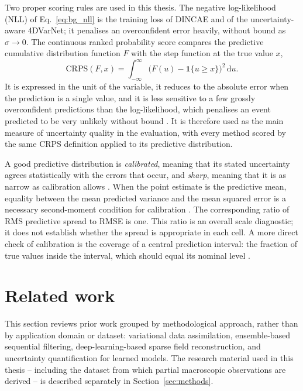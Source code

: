 \documentclass[english, 12pt, a4paper, elec, utf8, a-2b, online]{aaltothesis}
\begin{document}
Two proper scoring rules are used in this thesis. The negative log-likelihood (NLL) of
Eq.~\eqref{eq:bg_nll} is the training loss of DINCAE and of the uncertainty-aware
4DVarNet; it penalises an overconfident error heavily, without bound as
$\sigma \to 0$. The continuous ranked probability score
\cite{gneiting2007scoring} compares the predictive cumulative distribution
function $F$ with the step function at the true value $x$,
\begin{equation}
	\mathrm{CRPS}(F, x) = \int_{-\infty}^{\infty} \big( F(u) - \mathbf{1}\{u \ge x\} \big)^2 \, \mathrm{d}u .
	\label{eq:bg_crps}
\end{equation}
It is expressed in the unit of the variable, it reduces to the absolute error
when the prediction is a single value, and it is less sensitive to a few
grossly overconfident predictions than the log-likelihood, which penalises an
event predicted to be very unlikely without bound \cite{gneiting2007scoring}. It is therefore used
as the main measure of uncertainty quality in the evaluation, with every method
scored by the same CRPS definition applied to its predictive distribution.

A good predictive distribution is \emph{calibrated}, meaning that its stated
uncertainty agrees statistically with the errors that occur, and \emph{sharp},
meaning that it is as narrow as calibration allows \cite{gneiting2007scoring}.
When the point estimate is the predictive mean, equality between the mean
predicted variance and the mean squared error is a necessary second-moment
condition for calibration \cite{dirkson2025spread}. The corresponding ratio of
RMS predictive spread to RMSE is one. This ratio is an overall scale diagnostic;
it does not establish whether the spread is appropriate in each cell. A more
direct check of calibration is the coverage of a central prediction interval:
the fraction of true values inside the interval, which should equal its nominal
level \cite{gneiting2007scoring}.

\section{Related work}
\label{sec:related_work}

This section reviews prior work grouped by methodological approach,
rather than by application domain or dataset: variational data
assimilation, ensemble-based sequential filtering, deep-learning-based
sparse field reconstruction, and uncertainty quantification for
learned models. The research material used in this thesis --
including the dataset from which partial macroscopic observations
are derived -- is described separately in
Section~\ref{sec:methods}.
\end{document}
